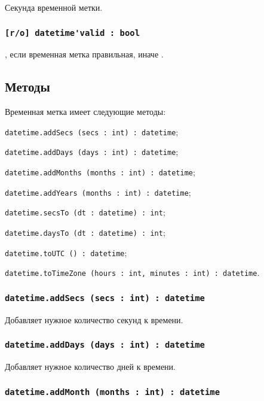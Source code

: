 Секунда временной метки.

\subsubsection{\lstinline|[r/о] datetime'valid : bool|}

\true, если временная метка правильная, иначе \false.

\subsection{Методы}

Временная метка имеет следующие методы:
\begin{icItems}
	\item \lstinline|datetime.addSecs (secs : int) : datetime|;
	\item \lstinline|datetime.addDays (days : int) : datetime|;
	\item \lstinline|datetime.addMonths (months : int) : datetime|;
	\item \lstinline|datetime.addYears (months : int) : datetime|;
	\item \lstinline|datetime.secsTo (dt : datetime) : int|;
	\item \lstinline|datetime.daysTo (dt : datetime) : int|;
	\item \lstinline|datetime.toUTC () : datetime|;
	\item \lstinline|datetime.toTimeZone (hours : int, minutes : int) : datetime|.
\end{icItems}

\subsubsection{\lstinline|datetime.addSecs (secs : int) : datetime|}

Добавляет нужное количество секунд к времени.

\subsubsection{\lstinline|datetime.addDays (days : int) : datetime|}

Добавляет нужное количество дней к времени.

\subsubsection{\lstinline|datetime.addMonth (months : int) : datetime|}

